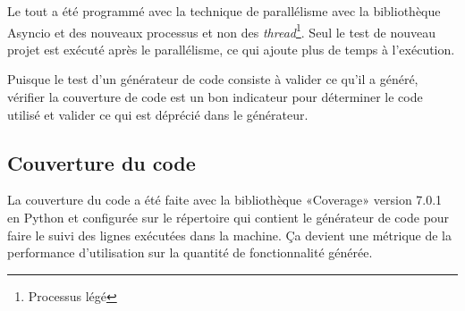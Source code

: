 Le tout a été programmé avec la technique de parallélisme avec la bibliothèque Asyncio et des nouveaux processus et non des \textit{thread}\footnote{Processus légé}. Seul le test de nouveau projet est exécuté après le parallélisme, ce qui ajoute plus de temps à l’exécution.

Puisque le test d’un générateur de code consiste à valider ce qu’il a généré, vérifier la couverture de code est un bon indicateur pour déterminer le code utilisé et valider ce qui est déprécié dans le générateur.

\subsection{Couverture du code}
La couverture du code a été faite avec la bibliothèque «Coverage» version 7.0.1 en Python et configurée sur le répertoire qui contient le générateur de code pour faire le suivi des lignes exécutées dans la machine. Ça devient une métrique de la performance d’utilisation sur la quantité de fonctionnalité générée.

